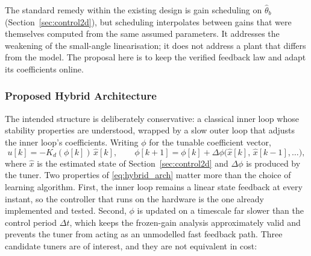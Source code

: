The standard remedy within the existing design is gain scheduling on
$\hat\theta_b$ (Section~\ref{sec:control2d}), but scheduling interpolates
between gains that were themselves computed from the same assumed parameters.
It addresses the weakening of the small-angle linearisation; it does not
address a plant that differs from the model. The proposal here is to keep the
verified feedback law and adapt its coefficients online.

\subsubsection{Proposed Hybrid Architecture}

The intended structure is deliberately conservative: a classical inner loop
whose stability properties are understood, wrapped by a slow outer loop that
adjusts the inner loop's coefficients. Writing $\phi$ for the tunable
coefficient vector,
\begin{equation}
u[k] = -K_d(\phi[k])\,\hat x[k],
\qquad
\phi[k+1] = \phi[k] + \Delta\phi\big(\hat x[k],\, \hat x[k-1], \dots\big),
\label{eq:hybrid_arch}
\end{equation}
where $\hat x$ is the estimated state of Section~\ref{sec:control2d} and
$\Delta\phi$ is produced by the tuner. Two properties of
\eqref{eq:hybrid_arch} matter more than the choice of learning algorithm.
First, the inner loop remains a linear state feedback at every instant, so
the controller that runs on the hardware is the one already implemented and
tested. Second, $\phi$ is updated on a timescale far slower than the control
period $\Delta t$, which keeps the frozen-gain analysis approximately valid
and prevents the tuner from acting as an unmodelled fast feedback path. Three
candidate tuners are of interest, and they are not equivalent in cost:

